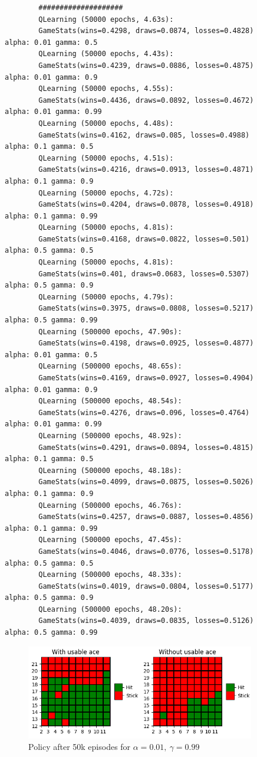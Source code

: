 \documentclass{article}
\begin{document}
    \begin{verbatim}
        ####################
        QLearning (50000 epochs, 4.63s):
        GameStats(wins=0.4298, draws=0.0874, losses=0.4828)        alpha: 0.01 gamma: 0.5
        QLearning (50000 epochs, 4.43s):
        GameStats(wins=0.4239, draws=0.0886, losses=0.4875)        alpha: 0.01 gamma: 0.9
        QLearning (50000 epochs, 4.55s):
        GameStats(wins=0.4436, draws=0.0892, losses=0.4672)        alpha: 0.01 gamma: 0.99
        QLearning (50000 epochs, 4.48s):
        GameStats(wins=0.4162, draws=0.085, losses=0.4988)        alpha: 0.1 gamma: 0.5
        QLearning (50000 epochs, 4.51s):
        GameStats(wins=0.4216, draws=0.0913, losses=0.4871)        alpha: 0.1 gamma: 0.9
        QLearning (50000 epochs, 4.72s):
        GameStats(wins=0.4204, draws=0.0878, losses=0.4918)        alpha: 0.1 gamma: 0.99
        QLearning (50000 epochs, 4.81s):
        GameStats(wins=0.4168, draws=0.0822, losses=0.501)        alpha: 0.5 gamma: 0.5
        QLearning (50000 epochs, 4.81s):
        GameStats(wins=0.401, draws=0.0683, losses=0.5307)        alpha: 0.5 gamma: 0.9
        QLearning (50000 epochs, 4.79s):
        GameStats(wins=0.3975, draws=0.0808, losses=0.5217)        alpha: 0.5 gamma: 0.99
        QLearning (500000 epochs, 47.90s):
        GameStats(wins=0.4198, draws=0.0925, losses=0.4877)        alpha: 0.01 gamma: 0.5
        QLearning (500000 epochs, 48.65s):
        GameStats(wins=0.4169, draws=0.0927, losses=0.4904)        alpha: 0.01 gamma: 0.9
        QLearning (500000 epochs, 48.54s):
        GameStats(wins=0.4276, draws=0.096, losses=0.4764)        alpha: 0.01 gamma: 0.99
        QLearning (500000 epochs, 48.92s):
        GameStats(wins=0.4291, draws=0.0894, losses=0.4815)        alpha: 0.1 gamma: 0.5
        QLearning (500000 epochs, 48.18s):
        GameStats(wins=0.4099, draws=0.0875, losses=0.5026)        alpha: 0.1 gamma: 0.9
        QLearning (500000 epochs, 46.76s):
        GameStats(wins=0.4257, draws=0.0887, losses=0.4856)        alpha: 0.1 gamma: 0.99
        QLearning (500000 epochs, 47.45s):
        GameStats(wins=0.4046, draws=0.0776, losses=0.5178)        alpha: 0.5 gamma: 0.5
        QLearning (500000 epochs, 48.33s):
        GameStats(wins=0.4019, draws=0.0804, losses=0.5177)        alpha: 0.5 gamma: 0.9
        QLearning (500000 epochs, 48.20s):
        GameStats(wins=0.4039, draws=0.0835, losses=0.5126)        alpha: 0.5 gamma: 0.99
    \end{verbatim}

    \begin{figure}[h]
        \centering
        \includegraphics[width=10cm]{plots/ql_policy_50k.png}
        \caption{Policy after 50k episodes for $\alpha=0.01,\ \gamma=0.99$}
    \end{figure}
\end{document}
